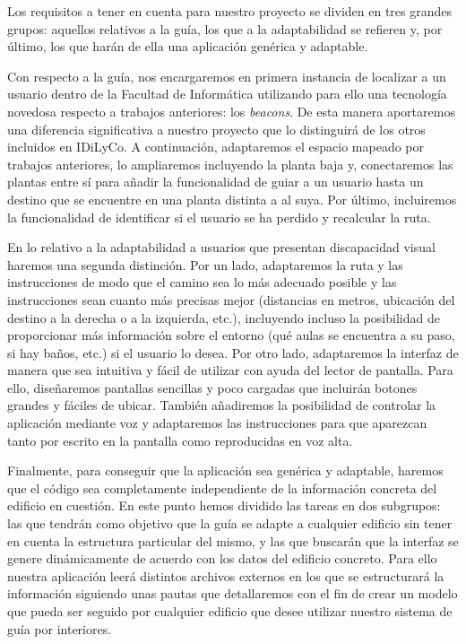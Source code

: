 Los requisitos a tener en cuenta para nuestro proyecto se dividen en tres grandes grupos: aquellos relativos a la guía, los que a la adaptabilidad se refieren y, por último, los que harán de ella una aplicación genérica y adaptable.

Con respecto a la guía, nos encargaremos en primera instancia de localizar a un usuario dentro de la Facultad de Informática utilizando para ello una tecnología novedosa respecto a trabajos anteriores: los \textit{beacons}. De esta manera aportaremos una diferencia significativa a nuestro proyecto que lo distinguirá de los otros incluidos en IDiLyCo. A continuación, adaptaremos el espacio mapeado por trabajos anteriores, lo ampliaremos incluyendo la planta baja y, conectaremos las plantas entre sí para añadir la funcionalidad de guiar a un usuario hasta un destino que se encuentre en una planta distinta a al suya. Por último, incluiremos la funcionalidad de identificar si el usuario se ha perdido y recalcular la ruta.

En lo relativo a la adaptabilidad a usuarios que presentan discapacidad visual haremos una segunda distinción. Por un lado, adaptaremos la ruta y las instrucciones de modo que el camino sea lo más adecuado posible y las instrucciones sean cuanto más precisas mejor (distancias en metros, ubicación del destino a la derecha o a la izquierda, etc.), incluyendo incluso la posibilidad de proporcionar más información sobre el entorno (qué aulas se encuentra a su paso, si hay baños, etc.) si el usuario lo desea. Por otro lado, adaptaremos la interfaz de manera que sea intuitiva y fácil de utilizar con ayuda del lector de pantalla. Para ello, diseñaremos pantallas sencillas y poco cargadas que incluirán botones grandes y fáciles de ubicar. También añadiremos la posibilidad de controlar la aplicación mediante voz y adaptaremos las instrucciones para que aparezcan tanto por escrito en la pantalla como reproducidas en voz alta.

Finalmente, para conseguir que la aplicación sea genérica y adaptable, haremos que el código sea completamente independiente de la información concreta del edificio en cuestión. En este punto hemos dividido las tareas en dos subgrupos: las que tendrán como objetivo que la guía se adapte a cualquier edificio sin tener en cuenta la estructura particular del mismo, y las que buscarán que la interfaz se genere dinámicamente de acuerdo con los datos del edificio concreto. Para ello nuestra aplicación leerá distintos archivos externos en los que se estructurará la información siguiendo unas pautas que detallaremos con el fin de crear un modelo que pueda ser seguido por cualquier edificio que desee utilizar nuestro sistema de guía por interiores.

